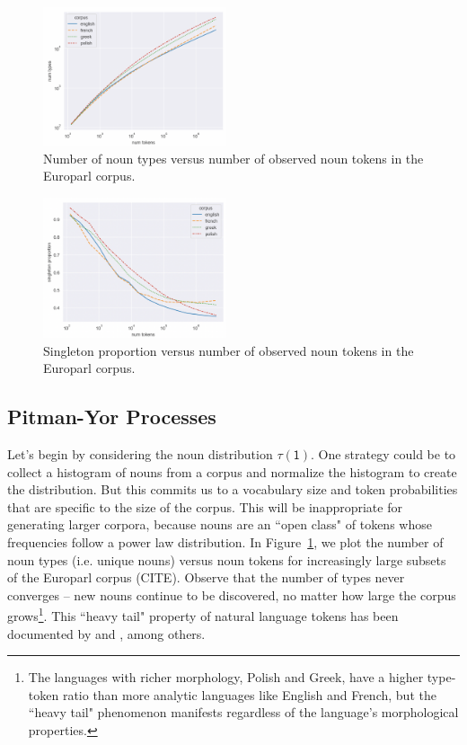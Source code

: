 \documentclass[11pt]{article}
\renewcommand{\bnfpn}[1]{\mathsf{#1}}
\begin{document}
\begin{figure}[t]
\centering
\includegraphics[width=0.48\textwidth]{images/type_token1.png}
\caption{Number of noun types versus number of observed noun tokens in the Europarl corpus.}
\label{fig:type_token1}
\end{figure}

\begin{figure}[t]
\centering
\includegraphics[width=0.48\textwidth]{images/sp1.png}
\caption{Singleton proportion versus number of observed noun tokens in the Europarl corpus.}
\label{fig:sp1}
\end{figure}

\subsection{Pitman-Yor Processes}

Let's begin by considering the noun distribution $\tau(\bnfpn{1})$. One strategy could be to collect a histogram of nouns from a corpus and normalize the histogram to create the distribution. But this commits us to a vocabulary size and token probabilities that are specific to the size of the corpus. This will be inappropriate for generating larger corpora, because nouns are an ``open class" of tokens whose frequencies follow a power law distribution. In Figure~\ref{fig:type_token1}, we plot the number of noun types (i.e. unique nouns) versus noun tokens for increasingly large subsets of the Europarl corpus (CITE). Observe that the number of types never converges -- new nouns continue to be discovered, no matter how large the corpus grows\footnote{The languages with richer morphology, Polish and Greek, have a higher type-token ratio than more analytic languages like English and French, but the ``heavy tail" phenomenon manifests regardless of the language's morphological properties.}. This ``heavy tail" property of natural language tokens has been documented by \cite{newman2005power} and \cite{teh-2006-hierarchical}, among others.
\end{document}
